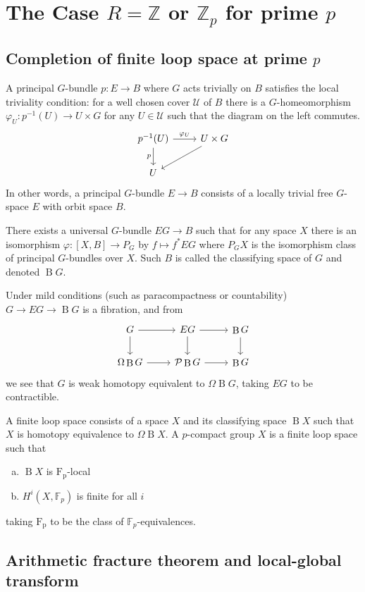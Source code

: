 \documentclass[psamsfonts]{amsart}
\theoremstyle{definition}
\theoremstyle{remark}
\newcommand{\Z}{\mathbb{Z}}
\newcommand{\F}{\mathbb{F}}
\DeclareMathOperator{\B}{B}
\numberwithin{equation}{section}
\begin{document}
\newpage
\section{The Case $R=\Z$ or $\Z_p$ for prime $p$}

\subsection{Completion of finite loop space at prime $p$}

A principal $G$-bundle $p:E\to B$ where $G$ acts trivially on $B$ satisfies the local triviality condition: for a well chosen cover $\mathcal{U}$ of $B$ there is a $G$-homeomorphism $\varphi_U:p^{-1}(U)\to U\times G$ for any $U\in\mathcal{U}$ such that the diagram on the left commutes.
\[\begin{tikzcd}
p^{-1}(U)\arrow[d,"p"']\arrow[r,"\varphi_U"]&U\times G\arrow[dl]\\
U
\end{tikzcd}\]
In other words, a principal $G$-bundle $E\to B$ consists of a locally trivial free $G$-space $E$ with orbit space $B$.

There exists a universal $G$-bundle $EG\to B$ such that for any space $X$ there is an isomorphism $\varphi:[X,B]\to P_G$ by $f\mapsto f^\ast EG$ where $P_GX$ is the isomorphism class of principal $G$-bundles over $X$. Such $B$ is called the classifying space of $G$ and denoted $\B G$.

Under mild conditions (such as paracompactness or countability) $G\to EG\to\B G$ is a fibration, and from
\[\begin{tikzcd}
G\arrow[r]\arrow[d]&EG\arrow[r]\arrow[d]&\B G\arrow[d]\\
\Omega\B G\arrow[r]&\mathcal{P}\B G\arrow[r]&\B G
\end{tikzcd}\]
we see that $G$ is weak homotopy equivalent to $\Omega\B G$, taking $EG$ to be contractible.

A finite loop space consists of a space $X$ and its classifying space $\B X$ such that $X$ is homotopy equivalence to $\Omega\B X$. A $p$-compact group $X$ is a finite loop space such that\begin{enumerate}[(a)]
    \item $\B X$ is $\mathrm{F_p}$-local
    \item $H^i(X,\F_p)$ is finite for all $i$
\end{enumerate}
taking $\mathrm{F_p}$ to be the class of $\F_p$-equivalences.

\subsection{Arithmetic fracture theorem and local-global transform}
\end{document}
